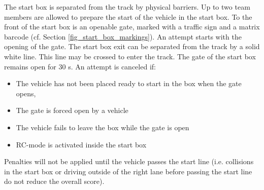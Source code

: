 The start box is separated from the track by physical barriers. Up to two team
members are allowed to prepare the start of the vehicle in the start box. To
the front of the start box is an openable gate, marked with a traffic sign and
a matrix barcode (cf. Section \ref{fig_start_box_markings}). An attempt starts
with the opening of the gate. The start box exit can be separated from the
track by a solid white line. This line may be crossed to enter the track. The
gate of the start box remains open for 30 s. An attempt is canceled if:

\begin{itemize}
	\item The vehicle has not been placed ready to start in the box when the gate opens,
	\item The gate is forced open by a vehicle
	\item The vehicle fails to leave the box while the gate is open
	\item RC-mode is activated inside the start box
\end{itemize}

Penalties will not be applied until the vehicle passes the start line (i.e.
collisions in the start box or driving outside of the right lane before passing
the start line do not reduce the overall score).

%
%
